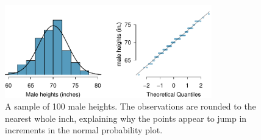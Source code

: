 \begin{figure}
\centering
\includegraphics[width=0.8\textwidth]{02/figures/fcidMHeights/fcidMHeights}
\caption{A sample of 100 male heights. The observations are rounded to the nearest whole inch, explaining why the points appear to jump in increments in the normal probability plot.}
\label{fcidMHeights}
\end{figure}

